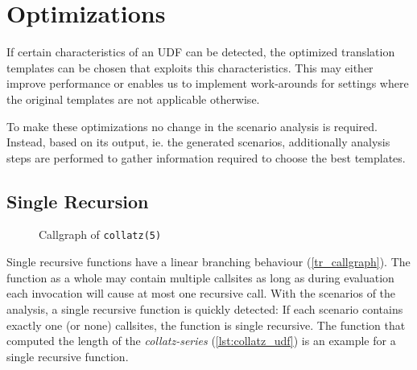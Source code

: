 \chapter{Optimizations}

If certain characteristics of an UDF can be detected, the optimized translation templates can be chosen that exploits this characteristics. This may either improve performance or enables us to implement work-arounds for settings where the original templates are not applicable otherwise.

To make these optimizations no change in the scenario analysis is required. Instead, based on its output, ie. the generated scenarios, additionally analysis steps are performed to gather information required to choose the best templates.



\section{Single Recursion}

\begin{wrapfigure}{r}{0.2\textwidth}
  \vspace{-20pt}\centering
{}
  \vspace{-10pt}
  \caption{Callgraph of \texttt{collatz(5)}}
  \label{tr_callgraph}
\end{wrapfigure}

Single recursive functions have a linear branching behaviour (\autoref{tr_callgraph}). The function as a whole may contain multiple callsites as long as during evaluation each invocation will cause at most one recursive call. With the scenarios of the analysis, a single recursive function is quickly detected: If each scenario contains exactly one (or none) callsites, the function is single recursive.
The function that computed the length of the \textit{collatz-series} (\autoref{lst:collatz_udf}) is an example for a single recursive function.

